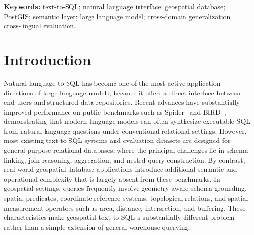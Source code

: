 \documentclass[11pt]{article}
\begin{document}
\begin{abstract}
for preview-style queries. These findings demonstrate that semantic grounding with intent-conditioned routing, augmented with error-attribution-driven rule addition, provides statistically significant gains for both GIS spatial accuracy and warehouse queries, supports cross-lingual queries with bounded degradation, and that rule effectiveness is domain-scoped rather than uniformly additive.
\end{abstract}

\noindent\textbf{Keywords:} text-to-SQL; natural language interface; geospatial database; PostGIS; semantic layer; large language model; cross-domain generalization; cross-lingual evaluation.

\section{Introduction}
\label{sec:intro}

Natural language to SQL has become one of the most active application directions of large language models, because it offers a direct interface between end users and structured data repositories. Recent advances have substantially improved performance on public benchmarks such as Spider~\cite{yu2018spider} and BIRD~\cite{li2023bird}, demonstrating that modern language models can often synthesize executable SQL from natural-language questions under conventional relational settings. However, most existing text-to-SQL systems and evaluation datasets are designed for general-purpose relational databases, where the principal challenges lie in schema linking, join reasoning, aggregation, and nested query construction. By contrast, real-world geospatial database applications introduce additional semantic and operational complexity that is largely absent from these benchmarks. In geospatial settings, queries frequently involve geometry-aware schema grounding, spatial predicates, coordinate reference systems, topological relations, and spatial measurement operators such as area, distance, intersection, and buffering. These characteristics make geospatial text-to-SQL a substantially different problem rather than a simple extension of general warehouse querying.
\end{document}
